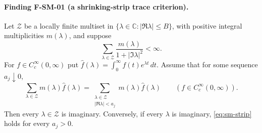 \documentclass[11pt,a4paper]{article}
\theoremstyle{definition}\newtheorem{definition}[theorem]{Definition}
\theoremstyle{remark}\newtheorem{remark}[theorem]{Remark}
\begin{document}
\paragraph{Finding F-SM-01 (a shrinking-strip trace criterion).}
Let $\mathcal Z$ be a locally finite multiset in
$\{\lambda\in\mathbb C:|\Re\lambda|\leq B\}$, with positive integral
multiplicities $m(\lambda)$, and suppose
\[
 \sum_{\lambda\in\mathcal Z}
       \frac{m(\lambda)}{1+|\Im\lambda|^2}<\infty.
\]
For $f\in C_c^\infty(0,\infty)$ put
$\widehat f(\lambda)=\int_0^\infty f(t)e^{\lambda t}\,dt$.
Assume that for some sequence $a_j\downarrow0$,
\begin{equation}\label{eq:sm-strip}
 \sum_{\lambda\in\mathcal Z}m(\lambda)\widehat f(\lambda)
  =\sum_{\substack{\lambda\in\mathcal Z\\|\Re\lambda|<a_j}}
           m(\lambda)\widehat f(\lambda)
 \qquad(f\in C_c^\infty(0,\infty)).
\end{equation}
Then every $\lambda\in\mathcal Z$ is imaginary.  Conversely, if every
$\lambda$ is imaginary, \eqref{eq:sm-strip} holds for every $a_j>0$.
\end{document}
